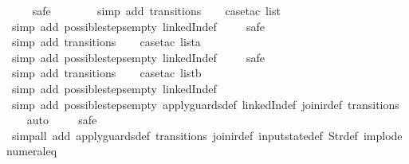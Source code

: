 \begin{isabellebody}
\ \ \ \isamarkupfalse%
\ safe{\isacharbrackleft}{}{\isacharbrackright}\isanewline
\ \ \ \ \ \ \isamarkupfalse%
\ {\isacharparenleft}simp\ add{\isacharcolon}\ transitions{\isacharparenright}{\isacharplus}\isanewline
\ \ \isamarkupfalse%
\ {\isacharparenleft}case{\isacharunderscore}tac\ list{\isacharparenright}\isanewline
\ \ \ \isamarkupfalse%
\ {\isacharparenleft}simp\ add{\isacharcolon}\ possible{\isacharunderscore}steps{\isacharunderscore}empty\ linkedIn{\isacharunderscore}def{\isacharparenright}\isanewline
\ \ \ \isamarkupfalse%
\ safe{\isacharbrackleft}{}{\isacharbrackright}\isanewline
\ \ \ \ \ \ \isamarkupfalse%
\ {\isacharparenleft}simp\ add{\isacharcolon}\ transitions{\isacharparenright}{\isacharplus}\isanewline
\ \ \isamarkupfalse%
\ {\isacharparenleft}case{\isacharunderscore}tac\ lista{\isacharparenright}\isanewline
\ \ \ \isamarkupfalse%
\ {\isacharparenleft}simp\ add{\isacharcolon}\ possible{\isacharunderscore}steps{\isacharunderscore}empty\ linkedIn{\isacharunderscore}def{\isacharparenright}\isanewline
\ \ \ \isamarkupfalse%
\ safe{\isacharbrackleft}{}{\isacharbrackright}\isanewline
\ \ \ \ \ \ \isamarkupfalse%
\ {\isacharparenleft}simp\ add{\isacharcolon}\ transitions{\isacharparenright}{\isacharplus}\isanewline
\ \ \isamarkupfalse%
\ {\isacharparenleft}case{\isacharunderscore}tac\ listb{\isacharparenright}\isanewline
\ \ \ \isamarkupfalse%
\ {\isacharparenleft}simp\ add{\isacharcolon}\ possible{\isacharunderscore}steps{\isacharunderscore}empty\ linkedIn{\isacharunderscore}def{\isacharparenright}\isanewline
\ \ \isamarkupfalse%
\isanewline
\ \ \ \isamarkupfalse%
\ {\isacharparenleft}simp\ add{\isacharcolon}\ possible{\isacharunderscore}steps{\isacharunderscore}empty\ apply{\isacharunderscore}guards{\isacharunderscore}def\ linkedIn{\isacharunderscore}def\ join{\isacharunderscore}ir{\isacharunderscore}def\ transitions{\isacharparenright}\isanewline
\ \ \isamarkupfalse%
\ auto{\isacharbrackleft}{}{\isacharbrackright}\isanewline
\ \ \ \isamarkupfalse%
\ safe\isanewline
\ \ \isamarkupfalse%
\ {\isacharparenleft}simp{\isacharunderscore}all\ add{\isacharcolon}\ apply{\isacharunderscore}guards{\isacharunderscore}def\ transitions\ join{\isacharunderscore}ir{\isacharunderscore}def\ input{}state{\isacharunderscore}def\ Str{\isacharunderscore}def\ implode\ numeral{\isacharunderscore}{}{\isacharunderscore}eq{\isacharunderscore}{}{\isacharparenright}%

\end{isabellebody}
